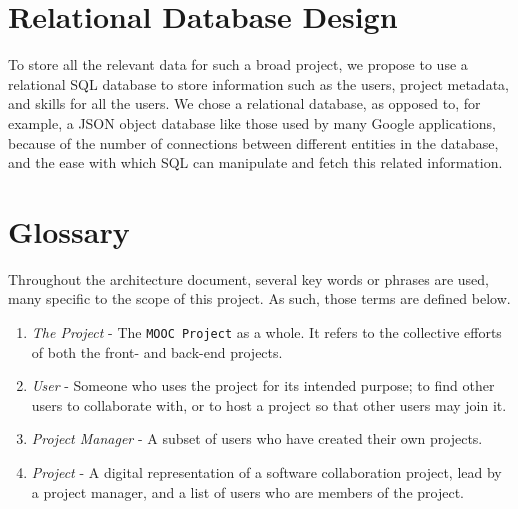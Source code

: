 \documentclass[a4paper, 12pt]{article}
\newcommand{\projectTitle}{\texttt{MOOC Project} }
\begin{document}
\section{Relational Database Design}
	To store all the relevant data for such a broad project, we propose to use a relational \textsc{SQL} database to store information such as the users, project metadata, and skills for all the users. We chose a relational database, as opposed to, for example, a JSON object database like those used by many Google applications, because of the number of connections between different entities in the database, and the ease with which \textsc{SQL} can manipulate and fetch this related information.

\section{Glossary}
	Throughout the architecture document, several key words or phrases are used, many specific to the scope of this project. As such, those terms are defined below.

	\begin{enumerate}
		\item \emph{The Project} - The \projectTitle as a whole. It refers to the collective efforts of both the front- and back-end projects.

		\item \emph{User} - Someone who uses the project for its intended purpose; to find other users to collaborate with, or to host a project so that other users may join it.

		\item \emph{Project Manager} - A subset of users who have created their own projects.

		\item \emph{Project} - A digital representation of a software collaboration project, lead by a project manager, and a list of users who are members of the project.

	\end{enumerate}
\end{document}

